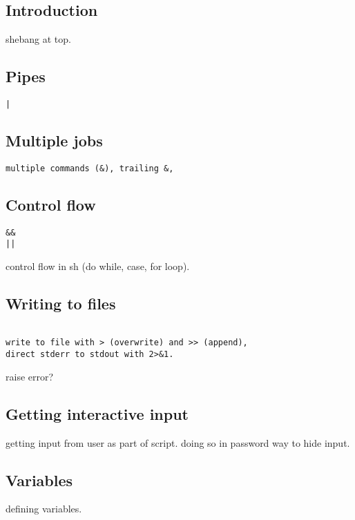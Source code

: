 
\subsection{Introduction}

shebang at top.

\subsection{Pipes}

\begin{verbatim}
|
\end{verbatim}

\subsection{Multiple jobs}


\begin{verbatim}
multiple commands (&), trailing &,
\end{verbatim}


\subsection{Control flow}


\begin{verbatim}
&&
||
\end{verbatim}

control flow in sh (do while, case, for loop).

\subsection{Writing to files}

\begin{verbatim}

write to file with > (overwrite) and >> (append),
direct stderr to stdout with 2>&1. 
\end{verbatim}

raise error?

\subsection{Getting interactive input}

getting input from user as part of script.
doing so in password way to hide input.

\subsection{Variables}
defining variables. 

